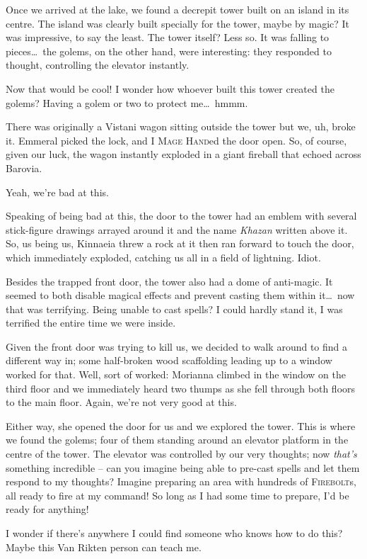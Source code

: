 Once we arrived at the lake, we found a decrepit tower built on an island in its centre. The island was clearly built specially for the tower, maybe by magic? It was impressive, to say the least. The tower itself? Less so. It was falling to pieces\dots\ the golems, on the other hand, were interesting: they responded to thought, controlling the elevator instantly.

Now that would be cool! I wonder how whoever built this tower created the golems? Having a golem or two to protect me\dots\ hmmm.

There was originally a Vistani wagon sitting outside the tower but we, uh, broke it. Emmeral picked the lock, and I \textsc{Mage Hand}ed the door open. So, of course, given our luck, the wagon instantly exploded in a giant fireball that echoed across Barovia.

Yeah, we're bad at this.

Speaking of being bad at this, the door to the tower had an emblem with several stick-figure drawings arrayed around it and the name \emph{Khazan} written above it. So, us being us, Kinnaeia threw a rock at it then ran forward to touch the door, which immediately exploded, catching us all in a field of lightning. Idiot.

Besides the trapped front door, the tower also had a dome of anti-magic. It seemed to both disable magical effects and prevent casting them within it\dots\ now that was terrifying. Being unable to cast spells? I could hardly stand it, I was terrified the entire time we were inside.

Given the front door was trying to kill us, we decided to walk around to find a different way in; some half-broken wood scaffolding leading up to a window worked for that. Well, sort of worked: Morianna climbed in the window on the third floor and we immediately heard two thumps as she fell through both floors to the main floor. Again, we're not very good at this.

Either way, she opened the door for us and we explored the tower. This is where we found the golems; four of them standing around an elevator platform in the centre of the tower. The elevator was controlled by our very thoughts; now \emph{that's} something incredible -- can you imagine being able to pre-cast spells and let them respond to my thoughts? Imagine preparing an area with hundreds of \textsc{Firebolt}s, all ready to fire at my command! So long as I had some time to prepare, I'd be ready for anything!

I wonder if there's anywhere I could find someone who knows how to do this? Maybe this Van Rikten person can teach me.

